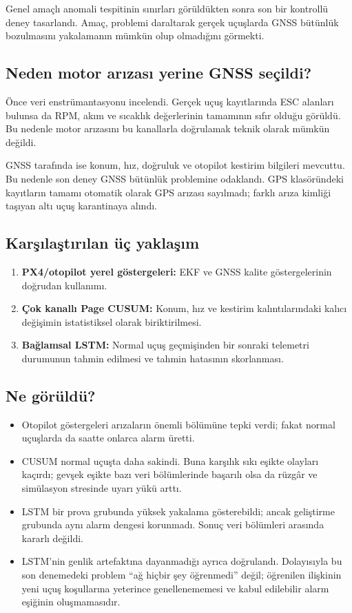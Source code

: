 \documentclass[11pt,a4paper]{article}
\begin{document}
Genel amaçlı anomali tespitinin sınırları görüldükten sonra son bir kontrollü
deney tasarlandı. Amaç, problemi daraltarak gerçek uçuşlarda GNSS bütünlük
bozulmasını yakalamanın mümkün olup olmadığını görmekti.

\subsection{Neden motor arızası yerine GNSS seçildi?}

Önce veri enstrümantasyonu incelendi. Gerçek uçuş kayıtlarında ESC alanları
bulunsa da RPM, akım ve sıcaklık değerlerinin tamamının sıfır olduğu görüldü.
Bu nedenle motor arızasını bu kanallarla doğrulamak teknik olarak mümkün değildi.

GNSS tarafında ise konum, hız, doğruluk ve otopilot kestirim bilgileri mevcuttu.
Bu nedenle son deney GNSS bütünlük problemine odaklandı. GPS klasöründeki
kayıtların tamamı otomatik olarak GPS arızası sayılmadı; farklı arıza kimliği
taşıyan altı uçuş karantinaya alındı.

\subsection{Karşılaştırılan üç yaklaşım}

\begin{enumerate}
  \item \textbf{PX4/otopilot yerel göstergeleri:} EKF ve GNSS kalite
  göstergelerinin doğrudan kullanımı.
  \item \textbf{Çok kanallı Page CUSUM:} Konum, hız ve kestirim kalıntılarındaki
  kalıcı değişimin istatistiksel olarak biriktirilmesi.
  \item \textbf{Bağlamsal LSTM:} Normal uçuş geçmişinden bir sonraki telemetri
  durumunun tahmin edilmesi ve tahmin hatasının skorlanması.
\end{enumerate}

\subsection{Ne görüldü?}

\begin{itemize}
  \item Otopilot göstergeleri arızaların önemli bölümüne tepki verdi; fakat
  normal uçuşlarda da saatte onlarca alarm üretti.
  \item CUSUM normal uçuşta daha sakindi. Buna karşılık sıkı eşikte olayları
  kaçırdı; gevşek eşikte bazı veri bölümlerinde başarılı olsa da rüzgâr ve
  simülasyon stresinde uyarı yükü arttı.
  \item LSTM bir prova grubunda yüksek yakalama gösterebildi; ancak geliştirme
  grubunda aynı alarm dengesi korunmadı. Sonuç veri bölümleri arasında kararlı
  değildi.
  \item LSTM'nin genlik artefaktına dayanmadığı ayrıca doğrulandı. Dolayısıyla
  bu son denemedeki problem ``ağ hiçbir şey öğrenmedi'' değil; öğrenilen
  ilişkinin yeni uçuş koşullarına yeterince genellenememesi ve kabul edilebilir
  alarm eşiğinin oluşmamasıdır.
\end{itemize}
\end{document}
